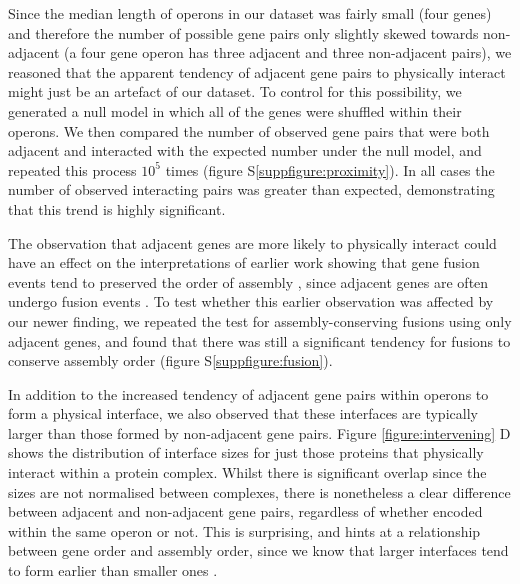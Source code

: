 \documentclass[a4paper,11pt,twoside,openright]{scrbook}
\begin{document}
Since the median length of operons in our dataset was fairly small (four genes) and therefore the number of possible gene pairs only slightly skewed towards non-adjacent (a four gene operon has three adjacent and three non-adjacent pairs), we reasoned that the apparent tendency of adjacent gene pairs to physically interact might just be an artefact of our dataset. To control for this possibility, we generated a null model in which all of the genes were shuffled within their operons. We then compared the number of observed gene pairs that were both adjacent and interacted with the expected number under the null model, and repeated this process \(10^{5}\) times (figure S\ref{suppfigure:proximity}). In all cases the number of observed interacting pairs was greater than expected, demonstrating that this trend is highly significant.

The observation that adjacent genes are more likely to physically interact could have an effect on the interpretations of earlier work showing that gene fusion events tend to preserved the order of assembly \cite{Marsh2013}, since adjacent genes are often undergo fusion events \cite{Pasek2006}. To test whether this earlier observation was affected by our newer finding, we repeated the test for assembly-conserving fusions using only adjacent genes, and found that there was still a significant tendency for fusions to conserve assembly order (figure S\ref{suppfigure:fusion}).

In addition to the increased tendency of adjacent gene pairs within operons to form a physical interface, we also observed that these interfaces are typically larger than those formed by non-adjacent gene pairs. Figure \ref{figure:intervening} D shows the distribution of interface sizes for just those proteins that physically interact within a protein complex. Whilst there is significant overlap since the sizes are not normalised between complexes, there is nonetheless a clear difference between adjacent and non-adjacent gene pairs, regardless of whether encoded within the same operon or not. This is surprising, and hints at a relationship between gene order and assembly order, since we know that larger interfaces tend to form earlier than smaller ones \cite{Levy2008,Marsh2013,Macek2017}.
\end{document}
